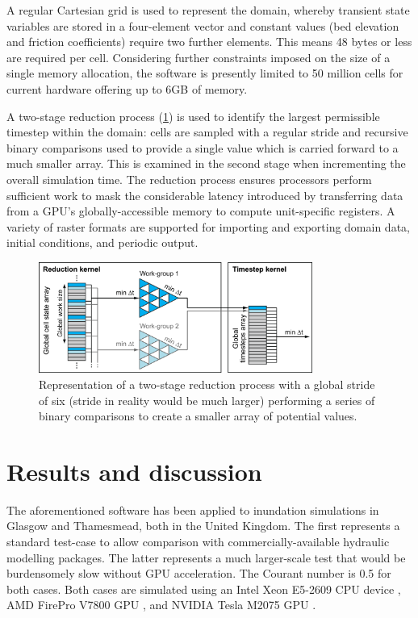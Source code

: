 \documentclass[11pt,english,a4paper]{article}
\begin{document}
A regular Cartesian grid is used to represent the domain, whereby transient state variables are stored in a four-element vector and constant values (bed elevation and friction coefficients) require two further elements. This means 48 bytes or less are required per cell. Considering further constraints imposed on the size of a single memory allocation, the software is presently limited to 50 million cells for current hardware offering up to 6GB of memory.

A two-stage reduction process (\ref{HiPIMS_Reduction}) is used to identify the largest permissible timestep within the domain: cells are sampled with a regular stride and recursive binary comparisons used to provide a single value which is carried forward to a much smaller array. This is examined in the second stage when incrementing the overall simulation time. The reduction process ensures processors perform sufficient work to mask the considerable latency introduced by transferring data from a GPU's globally-accessible memory to compute unit-specific registers. A variety of raster formats are supported for importing and exporting domain data, initial conditions, and periodic output. 

\begin{figure}[tpb]
\centering
\includegraphics[width=0.8\textwidth]{HiPIMS_Reduction_Colour.png}
\caption{Representation of a two-stage reduction process with a global stride of six (stride in reality would be much larger) performing a series of binary comparisons to create a smaller array of potential values.}
\label{HiPIMS_Reduction}
\end{figure}

\section{Results and discussion}

The aforementioned software has been applied to inundation simulations in Glasgow and Thamesmead, both in the United Kingdom. The first represents a standard test-case to allow comparison with commercially-available hydraulic modelling packages. The latter represents a much larger-scale test that would be burdensomely slow without GPU acceleration. The Courant number is 0.5 for both cases. Both cases are simulated using an Intel Xeon E5-2609 CPU device \citep{Intel_12}, AMD FirePro V7800 GPU \citep{AdvancedMicroDevicesInc2010a}, and NVIDIA Tesla M2075 GPU \citep{NVIDIACorporation2011}.
\end{document}
